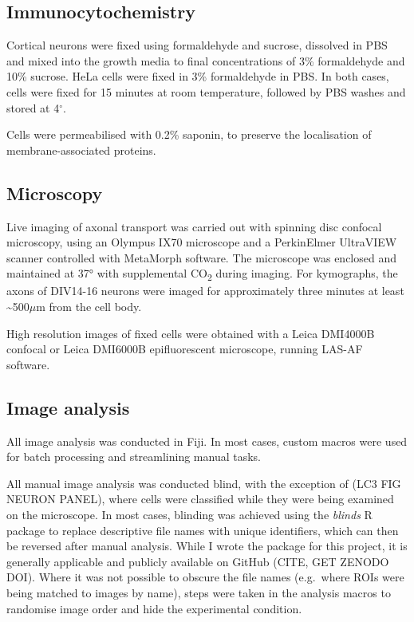 \documentclass[
  12pt,
  a4paper,
]{book}
\begin{document}
\hypertarget{immunocytochemistry}{%
\subsection{Immunocytochemistry}\label{immunocytochemistry}}

Cortical neurons were fixed using formaldehyde and sucrose, dissolved in PBS and mixed into the growth media to final concentrations of 3\% formaldehyde and 10\% sucrose. HeLa cells were fixed in 3\% formaldehyde in PBS. In both cases, cells were fixed for 15 minutes at room temperature, followed by PBS washes and stored at 4\(^{\circ}\).

Cells were permeabilised with 0.2\% saponin, to preserve the localisation of membrane-associated proteins.

\hypertarget{microscopy}{%
\subsection{Microscopy}\label{microscopy}}

Live imaging of axonal transport was carried out with spinning disc confocal microscopy, using an Olympus IX70 microscope and a PerkinElmer UltraVIEW scanner controlled with MetaMorph software. The microscope was enclosed and maintained at 37° with supplemental CO\textsubscript{2} during imaging. For kymographs, the axons of DIV14-16 neurons were imaged for approximately three minutes at least \textasciitilde500\(\mu\)m from the cell body.

High resolution images of fixed cells were obtained with a Leica DMI4000B confocal or Leica DMI6000B epifluorescent microscope, running LAS-AF software.

\hypertarget{image-analysis}{%
\subsection{Image analysis}\label{image-analysis}}

All image analysis was conducted in Fiji. In most cases, custom macros were used for batch processing and streamlining manual tasks.

All manual image analysis was conducted blind, with the exception of (LC3 FIG NEURON PANEL), where cells were classified while they were being examined on the microscope. In most cases, blinding was achieved using the \emph{blinds} R package to replace descriptive file names with unique identifiers, which can then be reversed after manual analysis. While I wrote the package for this project, it is generally applicable and publicly available on GitHub (CITE, GET ZENODO DOI). Where it was not possible to obscure the file names (e.g.~where ROIs were being matched to images by name), steps were taken in the analysis macros to randomise image order and hide the experimental condition.
\end{document}
